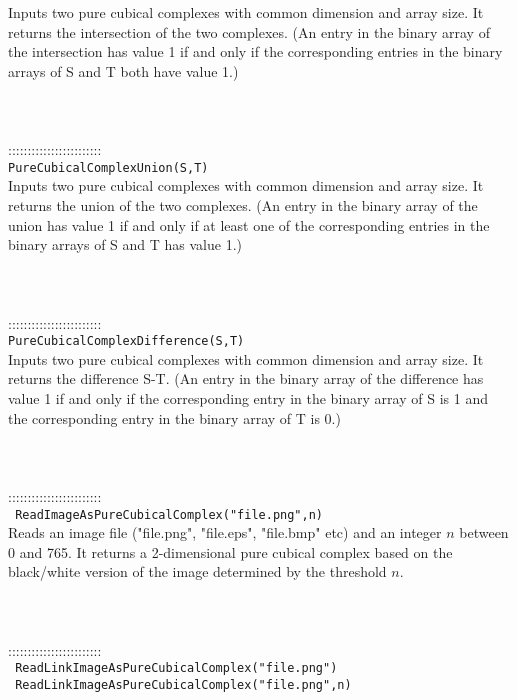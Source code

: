 \documentclass[a4paper,11pt]{report}
\begin{document}
{ Inputs two pure cubical complexes with common dimension and array size. It
returns the intersection of the two complexes. (An entry in the binary array
of the intersection has value 1 if and only if the corresponding entries in
the binary arrays of S and T both have value 1.) \\
 \\
 \\
 \\
 ::::::::::::::::::::::::\\
 \texttt{PureCubicalComplexUnion(S,T)}\\
 

 Inputs two pure cubical complexes with common dimension and array size. It
returns the union of the two complexes. (An entry in the binary array of the
union has value 1 if and only if at least one of the corresponding entries in
the binary arrays of S and T has value 1.) \\
 \\
 \\
 \\
 ::::::::::::::::::::::::\\
 \texttt{PureCubicalComplexDifference(S,T)}\\
 

 Inputs two pure cubical complexes with common dimension and array size. It
returns the difference S-T. (An entry in the binary array of the difference
has value 1 if and only if the corresponding entry in the binary array of S is
1 and the corresponding entry in the binary array of T is 0.) \\
 \\
 \\
 \\
 ::::::::::::::::::::::::\\
 \texttt{ ReadImageAsPureCubicalComplex("file.png",n)}\\
 

 Reads an image file ("file.png", "file.eps", "file.bmp" etc) and an integer $n$ between 0 and 765. It returns a 2-dimensional pure cubical complex based on
the black/white version of the image determined by the threshold $n$. \\
 \\
 \\
 \\
 ::::::::::::::::::::::::\\
 \texttt{ ReadLinkImageAsPureCubicalComplex("file.png")}\\
 \texttt{ ReadLinkImageAsPureCubicalComplex("file.png",n)}\\
 

}
\end{document}
